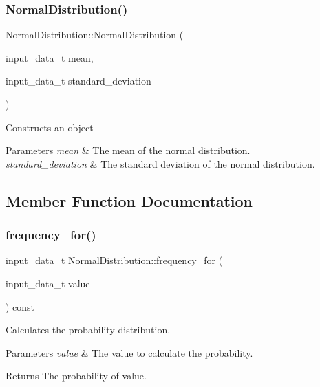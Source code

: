\subsubsection{\texorpdfstring{Normal\+Distribution()}{NormalDistribution()}}
{\footnotesize\ttfamily Normal\+Distribution\+::\+Normal\+Distribution (\begin{DoxyParamCaption}\item[{input\+\_\+data\+\_\+t}]{mean,  }\item[{input\+\_\+data\+\_\+t}]{standard\+\_\+deviation }\end{DoxyParamCaption})\hspace{0.3cm}{\ttfamily [inline]}}

Constructs an object 
\begin{DoxyParams}{Parameters}
{\em mean} & The mean of the normal distribution. \\
\hline
{\em standard\+\_\+deviation} & The standard deviation of the normal distribution. \\
\hline
\end{DoxyParams}


\subsection{Member Function Documentation}
\mbox{\label{classNormalDistribution_a6041c54ace5ecc585fdef3d21386e831}} 
\subsubsection{\texorpdfstring{frequency\+\_\+for()}{frequency\_for()}}
{\footnotesize\ttfamily input\+\_\+data\+\_\+t Normal\+Distribution\+::frequency\+\_\+for (\begin{DoxyParamCaption}\item[{input\+\_\+data\+\_\+t}]{value }\end{DoxyParamCaption}) const\hspace{0.3cm}{\ttfamily [virtual]}}

Calculates the probability distribution. 
\begin{DoxyParams}{Parameters}
{\em value} & The value to calculate the probability. \\
\hline
\end{DoxyParams}
\begin{DoxyReturn}{Returns}
The probability of value. 
\end{DoxyReturn}


